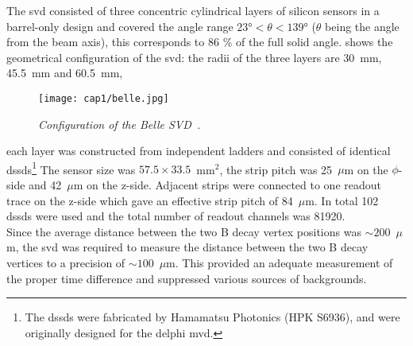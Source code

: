 The \gls{svd} consisted of three concentric cylindrical layers of silicon
sensors in a barrel-only design and covered the angle range
$\ang{23} < \theta < \ang{139}$ ($\theta$ being the angle from the beam axis),
this corresponds to 86 $\%$ of the full solid angle.  shows the
geometrical configuration of the \gls{svd}: the radii of the three layers are
30~mm, 45.5~mm and 60.5~mm,
\begin{figure}[!htbp]
  \centering\texttt{[image: cap1/belle.jpg]}
  \caption{\it Configuration of the Belle SVD~\cite{Belle}.}\label{belle_b}
\end{figure}
each layer was constructed from independent ladders and consisted of identical
\glspl{dssd}\footnote{The \glspl{dssd} were fabricated by Hamamatsu Photonics
  (HPK S6936), and were originally designed for the \gls{delphi} \gls{mvd}.}
The sensor size was $57.5 \times 33.5$~mm$^2$, the strip pitch was 25~$\mu$m on
the $\phi$-side and 42~$\mu$m on the z-side. Adjacent strips were connected to
one readout trace on the z-side which gave an effective strip pitch of
84~$\mu$m. In total 102 \glspl{dssd} were used and the
total number of readout channels was 81920.\\
Since the average distance between the two B decay vertex positions was
$\sim 200$~$\mu$m, the \gls{svd} was required to measure the distance between
the two B decay vertices to a precision of $\sim 100$~$\mu$m.  This provided an
adequate measurement of the proper time difference and suppressed various
sources of backgrounds.

